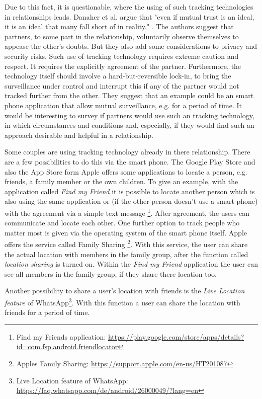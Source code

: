 Due to this fact, it is questionable, where the using of such tracking technologies in relationships leads.
Danaher et al. argue that "even if mutual trust is an ideal, it is an ideal that many fall short of in reality." \cite{doi:10.1080/15265161.2017.1409823}.
The authors suggest that partners, to some part in the relationship, voluntarily observe themselves to appease the other's doubts. But they also add some considerations to privacy and security risks. Such use of tracking technology requires extreme caution and respect. It requires the explicitly agreement of the partner. Furthermore, the technology itself should involve a hard-but-reversible lock-in, to bring the surveillance under control and interrupt this if any of the partner would not tracked further from the other.
They suggest that an example could be an smart phone application that allow mutual surveillance, e.g. for a period of time.
It would be interesting to survey if partners would use such an tracking technology, in which circumstances and conditions and, especially, if they would find such an approach desirable and helpful in a relationship. 

Some couples are using tracking technology already in there relationship. %
There are a few possibilities to do this via the smart phone. The Google Play Store and also the App Store form Apple offers some applications to locate a person, e.g. friends, a family member or the own children. To give an example, with the application called \textit{Find my Friend} it is possible to locate another person which is also using the same application or (if the other person doesn't use a smart phone) with the agreement via a simple text message \footnote{Find my Friends application: \url{https://play.google.com/store/apps/details?id=com.fsp.android.friendlocator}}. After agreement, the users can communicate and locate each other.
One further option to track people who matter most is given via the operating system of the smart phone itself. Apple offers the service called Family Sharing \footnote{Apples Family Sharing: \url{https://support.apple.com/en-us/HT201087}}. With this service, the user can share the actual location with members in the family group, after the function called \textit{location sharing} is turned on. Within the \textit{Find my Friend} application the user can see all members in the family group, if they share there location too.

Another possibility to share a user's location with friends is the \textit{Live Location feature} of WhatsApp\footnote{Live Location feature of WhatsApp: \url{https://faq.whatsapp.com/de/android/26000049/?lang=en}}. With this function a user can share the location with friends for a period of time.

